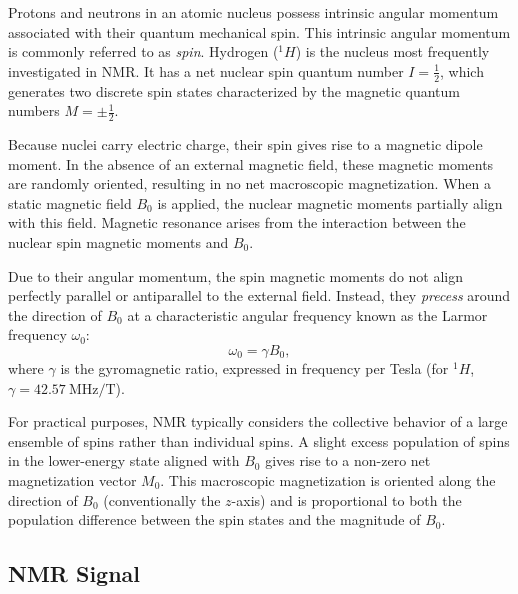     \par Protons and neutrons in an atomic nucleus possess intrinsic angular momentum associated with their quantum mechanical spin. This intrinsic angular momentum is commonly referred to as \textit{spin}. Hydrogen ($^{1}\!H$) is the nucleus most frequently investigated in NMR. It has a net nuclear spin quantum number $I=\tfrac{1}{2}$, which generates two discrete spin states characterized by the magnetic quantum numbers $M=\pm\tfrac{1}{2}$.
    \par Because nuclei carry electric charge, their spin gives rise to a magnetic dipole moment. In the absence of an external magnetic field, these magnetic moments are randomly oriented, resulting in no net macroscopic magnetization. When a static magnetic field $B_{0}$ is applied, the nuclear magnetic moments partially align with this field. Magnetic resonance arises from the interaction between the nuclear spin magnetic moments and $B_{0}$.
    \par Due to their angular momentum, the spin magnetic moments do not align perfectly parallel or antiparallel to the external field. Instead, they \textit{precess} around the direction of $B_{0}$ at a characteristic angular frequency known as the Larmor frequency $\omega_{0}$:
    \begin{equation}
        \omega_{0} = \gamma B_{0},
        \label{eq:larmor}
    \end{equation}
    where $\gamma$ is the gyromagnetic ratio, expressed in frequency per Tesla (for $^{1}\!H$, $\gamma = 42.57\ \text{MHz/T}$).
    \par For practical purposes, NMR typically considers the collective behavior of a large ensemble of spins rather than individual spins. A slight excess population of spins in the lower-energy state aligned with $B_{0}$ gives rise to a non-zero net magnetization vector $M_{0}$. This macroscopic magnetization is oriented along the direction of $B_{0}$ (conventionally the $z$-axis) and is proportional to both the population difference between the spin states and the magnitude of $B_{0}$.


\subsection{NMR Signal}

